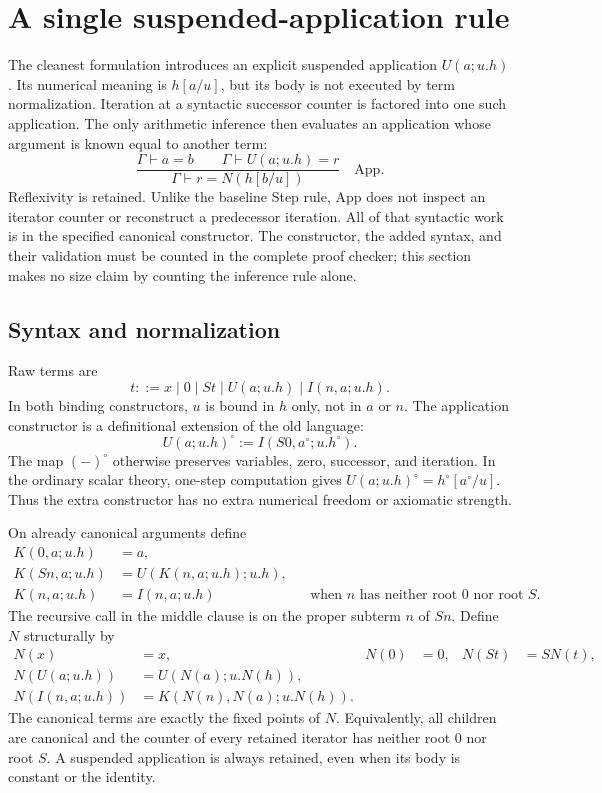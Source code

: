 
\section{A single suspended-application rule}

The cleanest formulation introduces an explicit suspended application
$U(a;u.h)$.  Its numerical meaning is $h[a/u]$, but its body is not
executed by term normalization.  Iteration at a syntactic successor
counter is factored into one such application.  The only arithmetic
inference then evaluates an application whose argument is known equal
to another term:
\[
 \boxed{\qquad
 \frac{\Gamma\vdash a=b\qquad\Gamma\vdash U(a;u.h)=r}
      {\Gamma\vdash r=N(h[b/u])}\quad\mathrm{App}.
 \qquad}
\]
Reflexivity is retained.  Unlike the baseline Step rule, App does not
inspect an iterator counter or reconstruct a predecessor iteration.
All of that syntactic work is in the specified canonical constructor.
The constructor, the added syntax, and their validation must be counted
in the complete proof checker; this section makes no size claim by
counting the inference rule alone.

\subsection{Syntax and normalization}

Raw terms are
\[
 t::=x\mid0\mid St\mid U(a;u.h)\mid I(n,a;u.h).
\]
In both binding constructors, $u$ is bound in $h$ only, not in $a$ or
$n$.  The application constructor is a definitional extension of the
old language:
\[
             U(a;u.h)^\circ:=I(S0,a^\circ;u.h^\circ).
\]
The map $(-)^\circ$ otherwise preserves variables, zero, successor,
and iteration.  In the ordinary scalar theory, one-step computation
gives $U(a;u.h)^\circ=h^\circ[a^\circ/u]$.  Thus the extra constructor
has no extra numerical freedom or axiomatic strength.

On already canonical arguments define
\begin{align*}
 K(0,a;u.h)&=a,\\
 K(Sn,a;u.h)&=U(K(n,a;u.h);u.h),\\
 K(n,a;u.h)&=I(n,a;u.h)
       &&\text{when $n$ has neither root $0$ nor root $S$.}
\end{align*}
The recursive call in the middle clause is on the proper subterm $n$
of $Sn$.  Define $N$ structurally by
\begin{align*}
 N(x)&=x,&N(0)&=0,&N(St)&=S N(t),\\
 N(U(a;u.h))&=U(N(a);u.N(h)),\\
 N(I(n,a;u.h))&=K(N(n),N(a);u.N(h)).
\end{align*}
The canonical terms are exactly the fixed points of $N$.  Equivalently,
all children are canonical and the counter of every retained iterator
has neither root $0$ nor root $S$.  A suspended application is always
retained, even when its body is constant or the identity.

